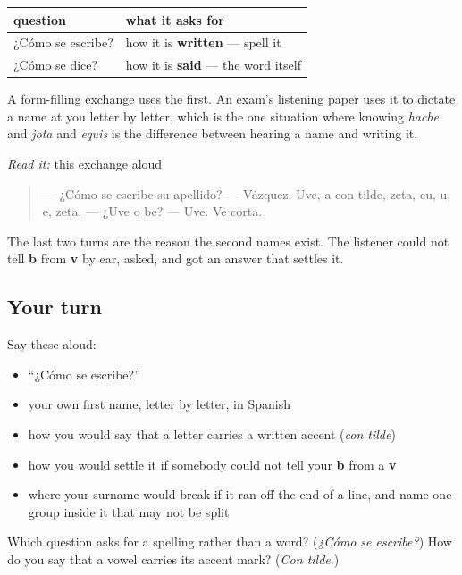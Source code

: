 \begin{grammarlens}[title={Grammar Lens: the question, and what it is not}]
\noindent
\begin{tabularx}{\linewidth}{@{}>{\raggedright\arraybackslash}X>{\raggedright\arraybackslash}X@{}}
\toprule
\textbf{question} & \textbf{what it asks for} \\
\midrule
¿Cómo se escribe? & how it is \textbf{written} — spell it \\
¿Cómo se dice? & how it is \textbf{said} — the word itself \\
\bottomrule
\end{tabularx}

A form-filling exchange uses the first. An exam's listening paper uses it to dictate a name at you letter by letter, which is the one situation where knowing \emph{hache} and \emph{jota} and \emph{equis} is the difference between hearing a name and writing it.
\end{grammarlens}

\begin{tcolorbox}[breakable,skin=enhanced,colback=orange!6,colframe=orange!45!black,boxrule=0.5pt,arc=1mm,left=6pt,right=6pt,top=4pt,bottom=4pt,fonttitle=\bfseries,title={Read this}]
\emph{Read it:} this exchange aloud

\begin{quote}
— ¿Cómo se escribe su apellido? — Vázquez. Uve, a con tilde, zeta, cu, u, e, zeta. — ¿Uve o be? — Uve. Ve corta.
\end{quote}

The last two turns are the reason the second names exist. The listener could not tell \textbf{b} from \textbf{v} by ear, asked, and got an answer that settles it.
\end{tcolorbox}

\subsection*{Your turn}
Say these aloud:

\begin{itemize}
\raggedright
  \item \textquotedblleft{}¿Cómo se escribe?\textquotedblright{}
  \item your own first name, letter by letter, in Spanish
  \item how you would say that a letter carries a written accent (\emph{con tilde})
  \item how you would settle it if somebody could not tell your \textbf{b} from a \textbf{v}
  \item where your surname would break if it ran off the end of a line, and name one group inside it that may not be split
\end{itemize}

\begin{tcolorbox}[breakable,colback=teal!4,colframe=teal!35!black,title={Before you move on}]
Which question asks for a spelling rather than a word? (\emph{¿Cómo se escribe?}) How do you say that a vowel carries its accent mark? (\emph{Con tilde}.)
\end{tcolorbox}
